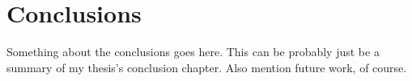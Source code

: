 \section{Conclusions}
\label{sec:Conclusions}

Something about the conclusions goes here. This can be probably just be a summary of my thesis's conclusion chapter. Also mention future work, of course.